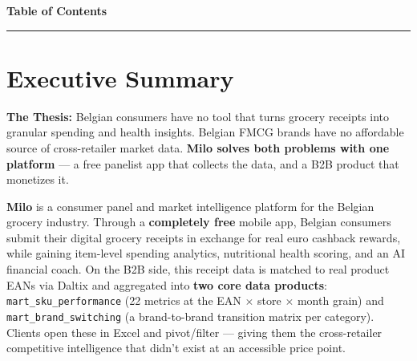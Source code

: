 \documentclass[11pt,a4paper]{article}
\begin{document}
\clearpage

\thispagestyle{fancy}

\vspace*{0.5cm}
{\color{milodark}\fontsize{28}{34}\selectfont\bfseries Table of Contents}\\[2pt]
{\color{miloaccent}\rule{6cm}{2pt}}

\vspace{1cm}
\renewcommand{\contentsname}{}
\setcounter{tocdepth}{2}
{
\hypersetup{linkcolor=milodark}
\tableofcontents
}

\clearpage

\section{Executive Summary}

\begin{alertbox}
\textbf{\color{milodark}The Thesis:} Belgian consumers have no tool that turns grocery receipts into granular spending and health insights. Belgian FMCG brands have no affordable source of cross-retailer market data. \textbf{Milo solves both problems with one platform} --- a free panelist app that collects the data, and a B2B product that monetizes it.
\end{alertbox}

\vspace{0.5em}

\textbf{Milo} is a consumer panel and market intelligence platform for the Belgian grocery industry. Through a \textbf{completely free} mobile app, Belgian consumers submit their digital grocery receipts in exchange for real euro cashback rewards, while gaining item-level spending analytics, nutritional health scoring, and an AI financial coach. On the B2B side, this receipt data is matched to real product EANs via Daltix and aggregated into \textbf{two core data products}: \texttt{mart\_sku\_performance} (22 metrics at the EAN $\times$ store $\times$ month grain) and \texttt{mart\_brand\_switching} (a brand-to-brand transition matrix per category). Clients open these in Excel and pivot/filter --- giving them the cross-retailer competitive intelligence that didn't exist at an accessible price point.
\end{document}
